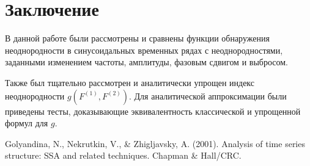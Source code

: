 \documentclass[specialist, substylefile = spbu.rtx,
			   subf, href, 12pt]{disser}
\begin{document}
\newpage
\chapter*{Заключение}

В данной работе были рассмотрены и сравнены функции обнаружения неоднородности в синусоидальных временных рядах с неоднородностями, заданными изменением частоты, амплитуды, фазовым сдвигом и выбросом. 

Также был тщательно рассмотрен и аналитически упрощен индекс неоднородности $ g(F^{(1)}, F^{(2)}) $. Для аналитической аппроксимации были приведены тесты, доказывающие эквивалентность классической и упрощенной формул для $ g $.




\begin{thebibliography}{3}
	Golyandina, N., Nekrutkin, V., \& Zhigljavsky, A. (2001). Analysis of time series structure: SSA and related techniques. Chapman \& Hall/CRC.
\end{thebibliography}

	
\end{document}
